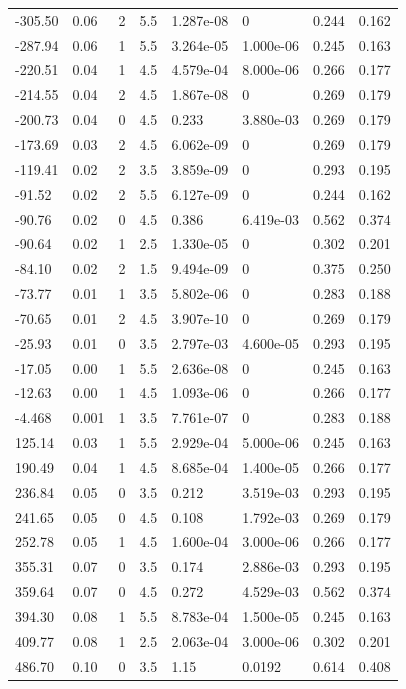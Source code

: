 \documentclass[preview]{standalone}
\begin{document}
{{\begin{tabular}{L{1.2cm}C{1.2cm} C{0.3cm}C{0.5cm} C{1.4cm}C{1.4cm} C{1.4cm}C{1.4cm}}
  -305.50  &  0.06  & 2     & 5.5 &  1.287e-08  & 0  & 0.244 &  0.162   \\ 
  -287.94  &  0.06  & 1     & 5.5 &  3.264e-05  & 1.000e-06  & 0.245 &  0.163   \\ 
  -220.51  &  0.04  & 1     & 4.5 &  4.579e-04  & 8.000e-06  & 0.266 &  0.177   \\ 
  -214.55  &  0.04  & 2     & 4.5 &  1.867e-08  & 0  & 0.269 &  0.179   \\ 
  -200.73  &  0.04  & 0     & 4.5 &  0.233  & 3.880e-03  & 0.269 &  0.179   \\ 
  -173.69  &  0.03  & 2     & 4.5 &  6.062e-09  & 0  & 0.269 &  0.179   \\ 
  -119.41  &  0.02  & 2     & 3.5 &  3.859e-09  & 0  & 0.293 &  0.195   \\ 
  -91.52  &  0.02  & 2     & 5.5 &  6.127e-09  & 0  & 0.244 &  0.162   \\ 
  -90.76  &  0.02  & 0     & 4.5 &  0.386  & 6.419e-03  & 0.562 &  0.374   \\ 
  -90.64  &  0.02  & 1     & 2.5 &  1.330e-05  & 0  & 0.302 &  0.201   \\ 
  -84.10  &  0.02  & 2     & 1.5 &  9.494e-09  & 0  & 0.375 &  0.250   \\ 
  -73.77  &  0.01  & 1     & 3.5 &  5.802e-06  & 0  & 0.283 &  0.188   \\ 
  -70.65  &  0.01  & 2     & 4.5 &  3.907e-10  & 0  & 0.269 &  0.179   \\ 
  -25.93  &  0.01  & 0     & 3.5 &  2.797e-03  & 4.600e-05  & 0.293 &  0.195   \\ 
  -17.05  &  0.00  & 1     & 5.5 &  2.636e-08  & 0  & 0.245 &  0.163   \\ 
  -12.63  &  0.00  & 1     & 4.5 &  1.093e-06  & 0  & 0.266 &  0.177   \\ 
  -4.468  &  0.001  & 1     & 3.5 &  7.761e-07  & 0  & 0.283 &  0.188   \\ 
  125.14  &  0.03  & 1     & 5.5 &  2.929e-04  & 5.000e-06  & 0.245 &  0.163   \\ 
  190.49  &  0.04  & 1     & 4.5 &  8.685e-04  & 1.400e-05  & 0.266 &  0.177   \\ 
  236.84  &  0.05  & 0     & 3.5 &  0.212  & 3.519e-03  & 0.293 &  0.195   \\ 
  241.65  &  0.05  & 0     & 4.5 &  0.108  & 1.792e-03  & 0.269 &  0.179   \\ 
  252.78  &  0.05  & 1     & 4.5 &  1.600e-04  & 3.000e-06  & 0.266 &  0.177   \\ 
  355.31  &  0.07  & 0     & 3.5 &  0.174  & 2.886e-03  & 0.293 &  0.195   \\ 
  359.64  &  0.07  & 0     & 4.5 &  0.272  & 4.529e-03  & 0.562 &  0.374   \\ 
  394.30  &  0.08  & 1     & 5.5 &  8.783e-04  & 1.500e-05  & 0.245 &  0.163   \\ 
  409.77  &  0.08  & 1     & 2.5 &  2.063e-04  & 3.000e-06  & 0.302 &  0.201   \\ 
  486.70  &  0.10  & 0     & 3.5 &  1.15  & 0.0192  & 0.614 &  0.408   \\ 
\hline 
\end{tabular} 

}}
\end{document}
